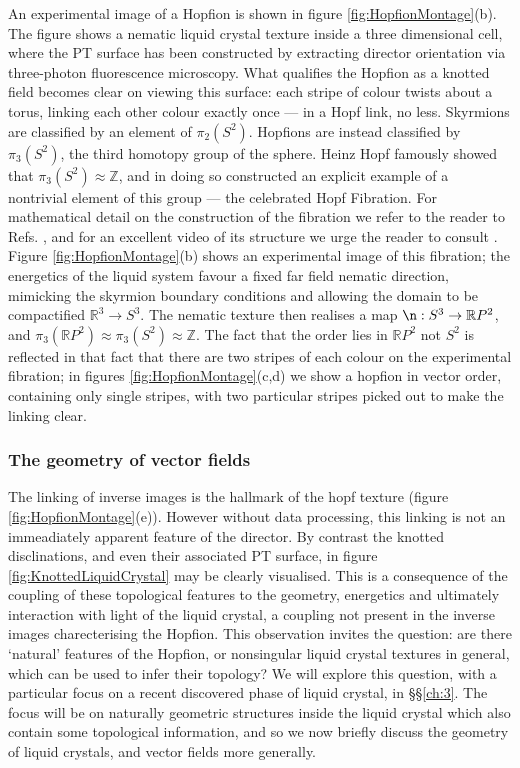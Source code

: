 An experimental image of a Hopfion is shown in figure \ref{fig:HopfionMontage}(b)\cite{Chen}. The figure shows a nematic liquid crystal texture inside a three dimensional cell, where the PT surface has been constructed by extracting director orientation via three-photon fluorescence microscopy. What qualifies the Hopfion as a knotted field becomes clear on viewing this surface: each stripe of colour twists about a torus, linking each other colour exactly once --- in a Hopf link, no less. Skyrmions are classified by an element of $\pi_2(S^2)$. Hopfions are instead classified by $\pi_3(S^2)$, the third homotopy group of the sphere. Heinz Hopf famously showed that $\pi_3(S^2) \approx \mathbb{Z}$, and in doing so constructed an explicit example of a nontrivial element of this group --- the celebrated Hopf Fibration. For mathematical detail on the construction of the fibration we refer to the reader to Refs. \cite{GarethBook BottTu}, and for an excellent video of its structure we urge the reader to consult \cite{Niles}. Figure \ref{fig:HopfionMontage}(b) shows an experimental image of this fibration; the energetics of the liquid system favour a fixed far field nematic direction, mimicking the skyrmion boundary conditions and allowing the domain to be compactified $\mathbb{R}^3\rightarrow {S}^3$. The nematic texture then realises a map $\n: S^3 \rightarrow \mathbb{R}P^2$, and $\pi_3(\mathbb{R}P^2) \approx \pi_3(S^2) \approx \mathbb{Z}$. The fact that the order lies in $\mathbb{R}P^2$ not $S^2$ is reflected in that fact that there are two stripes of each colour on the experimental fibration\cite{Chen,Ackerman}; in figures \ref{fig:HopfionMontage}(c,d) we show a hopfion in vector order, containing only single stripes, with two particular stripes picked out to make the linking clear.
\subsubsection{The geometry of vector fields}
The linking of inverse images is the hallmark of the hopf texture (figure \ref{fig:HopfionMontage}(e)). However without data processing, this linking is not an immeadiately apparent feature of the director. By contrast the knotted disclinations, and even their associated PT surface, in figure \ref{fig:KnottedLiquidCrystal} may be clearly visualised. This is a consequence of the coupling of these topological features to the geometry, energetics and ultimately interaction with light of the liquid crystal, a coupling not present in the inverse images charecterising the Hopfion. This observation invites the question: are there `natural' features of the Hopfion, or nonsingular liquid crystal textures in general, which can be used to infer their topology? We will explore this question, with a particular focus on a recent discovered phase of liquid crystal, in \S\S\ref{ch:3}. The focus will be on naturally geometric structures inside the liquid crystal which also contain some topological information, and so we now briefly discuss the geometry of liquid crystals, and vector fields more generally. 

